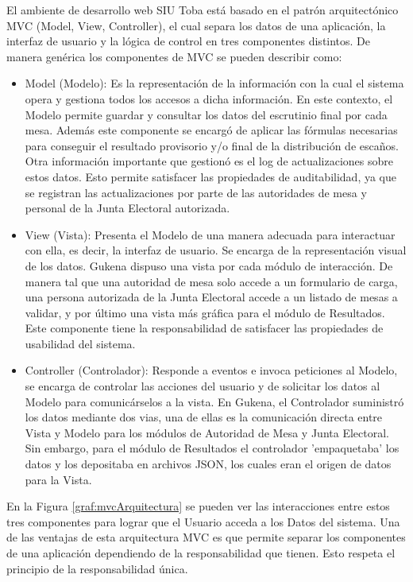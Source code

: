 El ambiente de desarrollo web SIU Toba está basado en el patrón arquitectónico MVC (Model, View, Controller), el cual separa los datos de una aplicación, la interfaz de usuario y la lógica de control en tres componentes distintos.
De manera genérica los componentes de MVC se pueden describir como:
\begin{itemize}
    \item Model (Modelo): Es la representación de la información con la cual el sistema opera y gestiona todos los accesos a dicha información. En este contexto, el Modelo permite guardar y consultar los datos del escrutinio final por cada mesa. Además este componente se encargó de aplicar las fórmulas necesarias para conseguir el resultado provisorio y/o final de la distribución de escaños. Otra información importante que gestionó es el log de actualizaciones sobre estos datos. Esto permite satisfacer las propiedades de auditabilidad, ya que se registran las actualizaciones por parte de las autoridades de mesa y personal de la Junta Electoral autorizada.
    \item View (Vista): Presenta el Modelo de una manera adecuada para interactuar con ella, es decir, la interfaz de usuario. Se encarga de la representación visual de los datos. Gukena dispuso una vista por cada módulo de interacción. De manera tal que una autoridad de mesa solo accede a un formulario de carga, una persona autorizada de la Junta Electoral accede a un listado de mesas a validar, y por último una vista más gráfica para el módulo de Resultados. Este componente tiene la responsabilidad de satisfacer las propiedades de usabilidad del sistema.
    \item Controller (Controlador): Responde a eventos e invoca peticiones al Modelo, se encarga de controlar las acciones del usuario y de solicitar los datos al Modelo para comunicárselos a la vista. En Gukena, el Controlador suministró los datos mediante dos vias, una de ellas es la comunicación directa entre Vista y Modelo para los módulos de Autoridad de Mesa y Junta Electoral. Sin embargo, para el módulo de Resultados el controlador 'empaquetaba' los datos y los depositaba en archivos JSON, los cuales eran el origen de datos para la Vista.
\end{itemize}
En la Figura \ref{graf:mvcArquitectura} se pueden ver las interacciones entre estos tres componentes para lograr que el Usuario acceda a los Datos del sistema. Una de las ventajas de esta arquitectura MVC es que permite separar los componentes de una aplicación dependiendo de la responsabilidad que tienen. Esto respeta el principio de la responsabilidad única.

